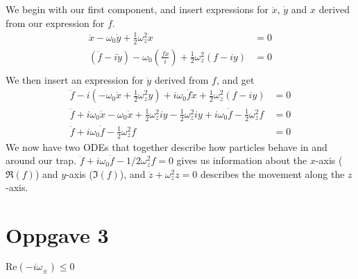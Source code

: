 %
We begin with our first component, and insert expressions for $\ddot x$, $\dot y$ and $x$ derived from our expression for $f$.
%
\begin{align*}
\ddot x - \omega_0 \dot y + \frac{1}{2} \omega_z^2 x &= 0 \\
\left( \ddot f - i \ddot y \right) - \omega_0 \left( \frac{\dot f \dot x}{i} \right) + \frac{1}{2} \omega_z^2 \left( f - iy \right) &= 0 \\
\end{align*}
%
We then insert an expression for $\ddot y$ derived from $f$, and get
%
\begin{align*}
\ddot f - i \left( - \omega_0 \dot x + \frac{1}{2} \omega_z^2 y \right) + i \omega_0 \dot f \dot x + \frac{1}{2} \omega_z^2 \left( f - iy \right) &= 0 \\
\ddot f + i \omega_0 \dot x - \omega_0 \dot x + \frac{1}{2} \omega_z^2 i y - \frac{1}{2} \omega_z^2 i y + i \omega_0 \dot f - \frac{1}{2} \omega_z^2 f &= 0 \\
\ddot f + i \omega_0 \dot f - \frac{1}{2} \omega_z^2 f &= 0
\end{align*}
%
We now have two ODEs that together describe how particles behave in and around our trap. $\ddot f + i \omega_0 \dot f - 1/2 \omega_z^2 f = 0$ gives us information about the $x$-axis ($\Re(f)$) and $y$-axis ($\Im(f)$), and $\ddot z + \omega_z^2 z = 0$ describes the movement along the $z$-axis. 


\section*{Oppgave 3}
$\text{Re}(-i\omega_\pm) \leq 0$
